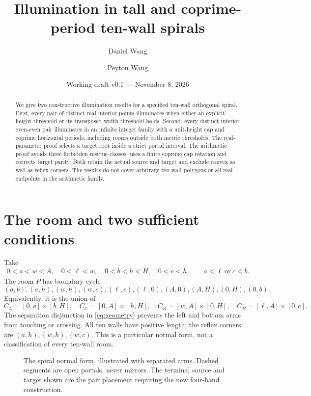 \documentclass[11pt]{article}
\title{Illumination in tall and coprime-period ten-wall spirals}
\author{Daniel Wang \and Peyton Wang}
\date{Working draft v0.1 --- November 8, 2026}
\theoremstyle{definition}
\begin{document}
\maketitle
\begin{abstract}
We give two constructive illumination results for a specified ten-wall orthogonal spiral. First, every pair of distinct real interior points illuminates when either an explicit height threshold or its transposed width threshold holds. Second, every distinct interior even-even pair illuminates in an infinite integer family with a unit-height cap and coprime horizontal periods, including rooms outside both metric thresholds. The real-parameter proof selects a target root inside a strict portal interval. The arithmetic proof avoids three forbidden residue classes, uses a finite coprime cap rotation and corrects target parity. Both retain the actual source and target and exclude convex as well as reflex corners. The results do not cover arbitrary ten-wall polygons or all real endpoints in the arithmetic family.
\end{abstract}

\section{The room and two sufficient conditions}
Take
\begin{gather}
 0<a<w<A,\quad0<\ell<w,\quad0<b<h<H,\quad0<c<h,
 \qquad a<\ell\ \text{or}\ c<b.\label{eq:geometry}
\end{gather}
The room $P$ has boundary cycle
\begin{equation}\label{eq:vertices}
 (a,b),(a,h),(w,h),(w,c),(\ell,c),(\ell,0),(A,0),(A,H),(0,H),(0,b).
\end{equation}
Equivalently, it is the union of
\[
 C_L=[0,a]\times[b,H],\quad C_U=[0,A]\times[h,H],\quad
 C_R=[w,A]\times[0,H],\quad C_B=[\ell,A]\times[0,c].
\]
The separation disjunction in \eqref{eq:geometry} prevents the left and bottom arms from touching or crossing. All ten walls have positive length; the reflex corners are $(a,h),(w,h),(w,c)$. This is a particular normal form, not a classification of every ten-wall room.

\begin{figure}[htbp]\centering
{}
\caption{The spiral normal form, illustrated with separated arms. Dashed segments are open portals, never mirrors. The terminal source and target shown are the pair placement requiring the new four-band construction.}
\end{figure}
\end{document}
